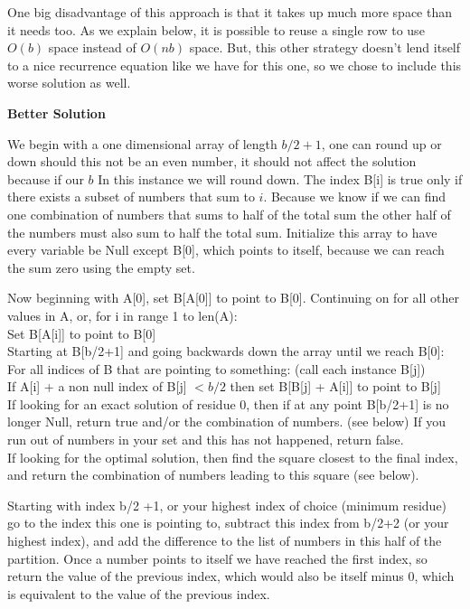 \documentclass[12pt]{article}
\begin{document}
\noindent One big disadvantage of this approach is that it takes up much more space than it needs too. As we explain below, it is possible to reuse a single row to use $O(b)$ space instead of $O(nb)$ space. But, this other strategy doesn't lend itself to a nice recurrence equation like we have for this one, so we chose to include this worse solution as well.
\medskip

\noindent \textbf{Better Solution}
\medskip

\noindent We begin with a one dimensional array of length $b/2 + 1$, one can round up or down should this not be an even number, it should not affect the solution because if our $b$  In this instance we will round down. The index B[i] is true only if there exists a subset of numbers that sum to $i$.  Because we know if we can find one combination of numbers that sums to half of the total sum the other half of the numbers must also sum to half the total sum.  Initialize this array to have every variable be Null except B[0], which points to itself, because we can reach the sum zero using the empty set.
\medskip

\noindent Now beginning with A[0], set B[A[0]] to point to B[0].  Continuing on for all other values in A, or, for i in range 1 to len(A):
\\ \indent Set B[A[i]] to point to B[0]
\\ \indent Starting at B[b/2+1] and going backwards down the array until we reach B[0]:
\\ \indent \indent For all indices of B that are pointing to something: (call each instance B[j])
\\ \indent \indent If A[i] + a non null index of B[j] $< b/2$ then set B[B[j] + A[i]] to point to B[j] 
\\ \indent If looking for an exact solution of residue 0, then if at any point B[b/2+1] is no longer Null, return true and/or the combination of numbers. (see below) If you run out of numbers in your set and this has not happened, return false.
\\ \indent If looking for the optimal solution, then find the square closest to the final index, and return the combination of numbers leading to this square (see below).
\medskip

\noindent Starting with index b/2 +1, or your highest index of choice (minimum residue) go to the index this one is pointing to, subtract this index from b/2+2 (or your highest index), and add the difference to the list of numbers in this half of the partition.  Once a number points to itself we have reached the first index, so return the value of the previous index, which would also be itself minus 0, which is equivalent to the value of the previous index.
\bigskip
\end{document}
